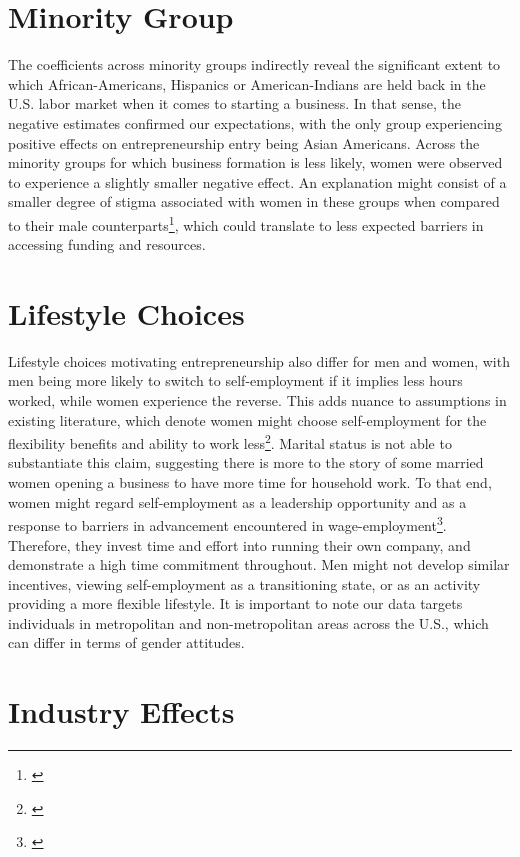 \section{Minority Group}

The coefficients across minority groups indirectly reveal the significant extent to which African-Americans, Hispanics or American-Indians are held back in the U.S. labor market when it comes to starting a business. In that sense, the negative estimates confirmed our expectations, with the only group experiencing positive effects on entrepreneurship entry being Asian Americans. Across the minority groups for which business formation is less likely, women were observed to experience a slightly smaller negative effect. An explanation might consist of a smaller degree of stigma associated with women in these groups when compared to their male counterparts\footnote{\cite{AlbaRumbautMarotz2005}}, which could translate to less expected barriers in accessing funding and resources. 

\section{Lifestyle Choices}
Lifestyle choices motivating entrepreneurship also differ for men and women, with men being more likely to switch to self-employment if it implies less hours worked, while women experience the reverse. This adds nuance to assumptions in existing literature, which denote women might choose self-employment for the flexibility benefits and ability to work less\footnote{\cite{bertrand2013gender}}. Marital status is not able to substantiate this claim, suggesting there is more to the story of some married women opening a business to have more time for household work. To that end, women might regard self-employment as a leadership opportunity and as a response to barriers in advancement encountered in wage-employment\footnote{\cite{olivetti2016dp11034}}. Therefore, they invest time and effort into running their own company, and demonstrate a high time commitment throughout. Men might not develop similar incentives, viewing self-employment as a transitioning state, or as an activity providing a more flexible lifestyle. It is important to note our data targets individuals in metropolitan and non-metropolitan areas across the U.S., which can differ in terms of gender attitudes. 


\section{Industry Effects}

